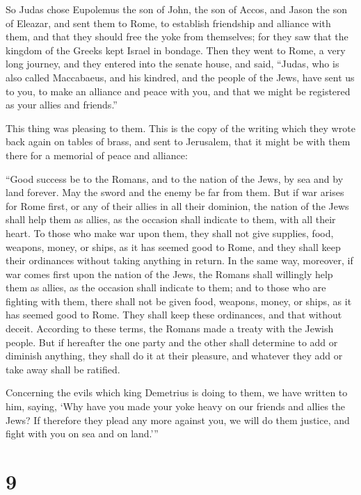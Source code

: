  So Judas chose Eupolemus the son of John, the son of
Accos, and Jason the son of Eleazar, and sent them to Rome, to establish
friendship and alliance with them,  and that they should
free the yoke from themselves; for they saw that the kingdom of the
Greeks kept Israel in bondage.  Then they went to Rome, a
very long journey, and they entered into the senate house, and said,
 ``Judas, who is also called Maccabaeus, and his kindred,
and the people of the Jews, have sent us to you, to make an alliance and
peace with you, and that we might be registered as your allies and
friends.''

 This thing was pleasing to them.  This is the
copy of the writing which they wrote back again on tables of brass, and
sent to Jerusalem, that it might be with them there for a memorial of
peace and alliance:

 ``Good success be to the Romans, and to the nation of the
Jews, by sea and by land forever. May the sword and the enemy be far
from them.  But if war arises for Rome first, or any of
their allies in all their dominion,  the nation of the Jews
shall help them as allies, as the occasion shall indicate to them, with
all their heart.  To those who make war upon them, they
shall not give supplies, food, weapons, money, or ships, as it has
seemed good to Rome, and they shall keep their ordinances without taking
anything in return.  In the same way, moreover, if war
comes first upon the nation of the Jews, the Romans shall willingly help
them as allies, as the occasion shall indicate to them; 
and to those who are fighting with them, there shall not be given food,
weapons, money, or ships, as it has seemed good to Rome. They shall keep
these ordinances, and that without deceit.  According to
these terms, the Romans made a treaty with the Jewish people.
 But if hereafter the one party and the other shall
determine to add or diminish anything, they shall do it at their
pleasure, and whatever they add or take away shall be ratified.

 Concerning the evils which king Demetrius is doing to
them, we have written to him, saying, `Why have you made your yoke heavy
on our friends and allies the Jews?  If therefore they
plead any more against you, we will do them justice, and fight with you
on sea and on land.'''

\hypertarget{section-8}{%
\section{9}\label{section-8}}

